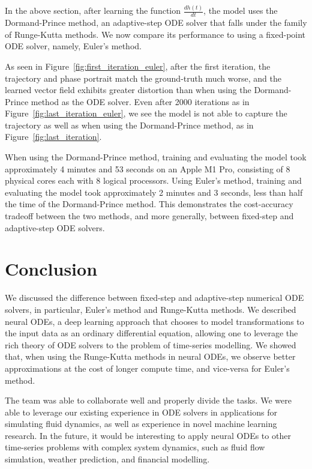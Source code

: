 \documentclass[11pt]{article}
\begin{document}
In the above section, after learning the function $\frac{dh(t)}{dt}$, the model uses the Dormand-Prince method, an adaptive-step ODE solver that falls under the family of Runge-Kutta methods. We now compare its performance to using a fixed-point ODE solver, namely, Euler's method.

As seen in Figure~\ref{fig:first_iteration_euler}, after the first iteration, the trajectory and phase portrait match the ground-truth much worse, and the learned vector field exhibits greater distortion than when using the Dormand-Prince method as the ODE solver. Even after 2000 iterations as in Figure~\ref{fig:last_iteration_euler}, we see the model is not able to capture the trajectory as well as when using the Dormand-Prince method, as in Figure~\ref{fig:last_iteration}.

When using the Dormand-Prince method, training and evaluating the model took approximately 4 minutes and 53 seconds on an Apple M1 Pro, consisting of 8 physical cores each with 8 logical processors. Using Euler's method, training and evaluating the model took approximately 2 minutes and 3 seconds, less than half the time of the Dormand-Prince method. This demonstrates the cost-accuracy tradeoff between the two methods, and more generally, between fixed-step and adaptive-step ODE solvers.

\section{Conclusion}

We discussed the difference between fixed-step and adaptive-step numerical ODE solvers, in particular, Euler's method and Runge-Kutta methods. We described neural ODEs, a deep learning approach that chooses to model transformations to the input data as an ordinary differential equation, allowing one to leverage the rich theory of ODE solvers to the problem of time-series modelling. We showed that, when using the Runge-Kutta methods in neural ODEs, we observe better approximations at the cost of longer compute time, and vice-versa for Euler's method.

The team was able to collaborate well and properly divide the tasks. We were able to leverage our existing experience in ODE solvers in applications for simulating fluid dynamics, as well as experience in novel machine learning research. In the future, it would be interesting to apply neural ODEs to other time-series problems with complex system dynamics, such as fluid flow simulation, weather prediction, and financial modelling.
\end{document}
